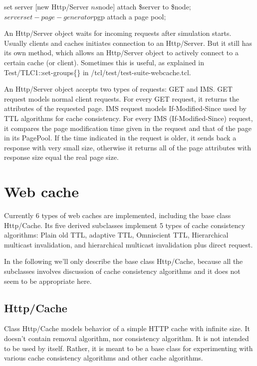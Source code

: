 \begin{program}
        set server [new Http/Server $ns $node] \; attach \$server to \$node;
        $server set-page-generator $pgp \; attach a page pool;
\end{program}

An Http/Server object waits for incoming requests after simulation starts.
Usually clients and caches initiates connection to an Http/Server. But 
it still has its own  method, which allows an Http/Server 
object to actively connect to a certain cache (or client). Sometimes this
is useful, as explained in Test/TLC1::set-groups\{\} in 
\ns/tcl/test/test-suite-webcache.tcl.

An Http/Server object accepts two types of requests: GET and IMS.  GET
request models normal client requests. For every GET request, it
returns the attributes of the requested page.  IMS request models
If-Modified-Since used by TTL algorithms for cache consistency. For
every IMS (If-Modified-Since) request, it compares the page
modification time given in the request and that of the page in its
PagePool. If the time indicated in the request is older, it sends back
a response with very small size, otherwise it returns all of the page 
attributes with response size equal the real page size.


\section{Web cache}
\label{sec:webcache-cache}

Currently 6 types of web caches are implemented, including 
the base class Http/Cache. Its five derived subclasses 
implement 5 types of cache consistency algorithms: Plain old TTL, 
adaptive TTL, Omniscient TTL, Hierarchical multicast invalidation, 
and hierarchical multicast invalidation plus direct request.

In the following we'll only describe the base class Http/Cache, because 
all the subclasses involves discussion of cache consistency algorithms 
and it does not seem to be appropriate here.

\subsection{Http/Cache}
\label{sec:webcache-cache-base}

Class Http/Cache models behavior of a simple HTTP cache with infinite 
size. It doesn't contain removal algorithm, nor consistency algorithm. 
It is not intended to be used by itself. Rather, it is meant to be a 
base class for experimenting with various cache consistency algorithms and
other cache algorithms. 

